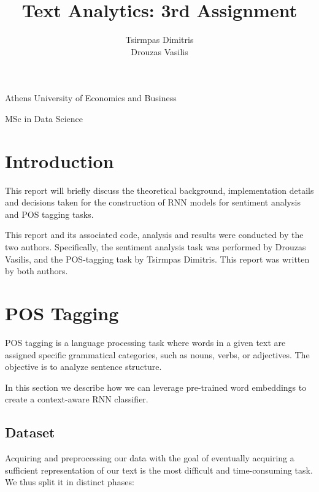 \documentclass[10pt, a4paper]{article}
\title{\Huge Text Analytics: 3rd Assignment}
\author{\LARGE Tsirmpas Dimitris\\\LARGE Drouzas Vasilis}
\begin{document}
	
	\begin{titlepage}
		\maketitle
		\begin{center}
			
			\large Athens University of Economics and Business
			
			\large MSc in Data Science
			
		\end{center}
		
	\end{titlepage}
	
	\tableofcontents
	\newpage	
	
	\section{Introduction}
	
	This report will briefly discuss the theoretical background, implementation details and decisions taken for the construction of RNN models for sentiment analysis and POS tagging tasks.
	
	This report and its associated code, analysis and results were conducted by the two authors. Specifically, the sentiment analysis task was performed by Drouzas Vasilis, and the POS-tagging task by Tsirmpas Dimitris. This report was written by both authors.
	
	
	\section{POS Tagging}
	
	POS tagging is a language processing task where words in a given text are assigned specific grammatical categories, such as nouns, verbs, or adjectives. The objective is to analyze sentence structure. 
	
	In this section we describe how we can leverage pre-trained word embeddings to create a context-aware RNN classifier.
	
	
	\subsection{Dataset}
	
	Acquiring and preprocessing our data with the goal of eventually acquiring a sufficient representation of our text is the most difficult and time-consuming task. We thus split it in distinct phases:
	
\end{document}
